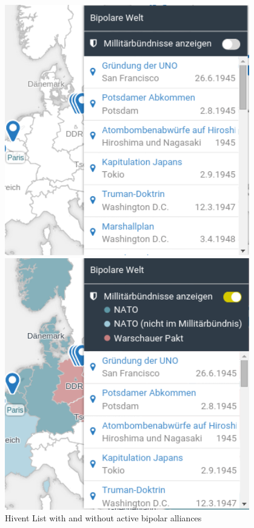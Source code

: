 \begin{figure}[H]
  \centering
  \begin{minipage}{0.45\textwidth}
    \includegraphics[width=0.95\textwidth]{graphics/bpa1.png}
  \end{minipage}
  \begin{minipage}{0.45\textwidth}
    \includegraphics[width=0.95\textwidth]{graphics/bpa2.png}
  \end{minipage}
  \caption{Hivent List with and without active bipolar alliances}
  \label{fig:HL_options}
\end{figure}


